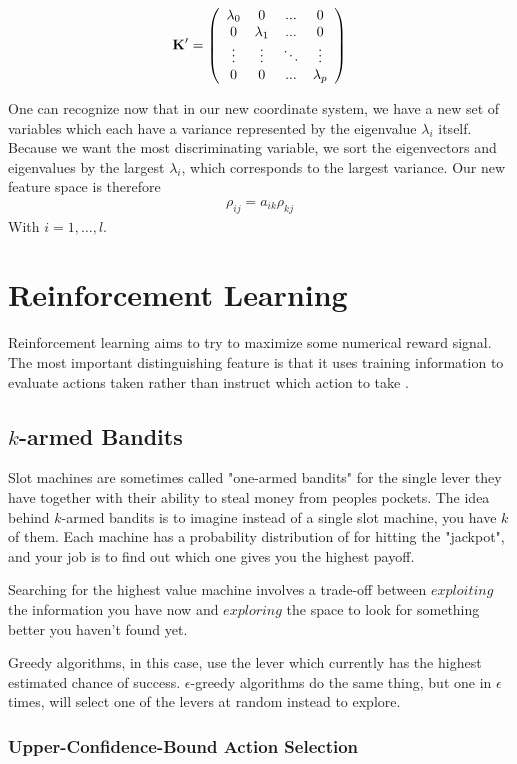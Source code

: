 $$\bf{K}' = \left(
{\begin{array}{cccc}
\lambda_0 & 0 &...&0 \\
0 & \lambda_1 & ...&0\\
\vdots & \vdots &\ddots & \vdots \\
0 & 0 & ... &\lambda_p
\end{array}}
\right)
$$

One can recognize now that in our new coordinate system, we have a new set of variables which each have a variance represented by the eigenvalue $\lambda_i$ itself. Because we want the most discriminating variable, we sort the eigenvectors and eigenvalues by the largest $\lambda_i$, which corresponds to the largest variance. Our new feature space is therefore
\begin{align}
	\rho_{ij} = a_{ik}\rho_{kj}
\end{align}
With $i=1,\dots,l$.


\section{Reinforcement Learning}
Reinforcement learning aims to try to maximize some numerical reward signal. The most important distinguishing feature is that it uses training information to evaluate actions taken rather than instruct which action to take \cite{sutton}.


\subsection{$k$-armed Bandits}
Slot machines are sometimes called "one-armed bandits" for the single lever they have together with their ability to steal money from peoples pockets. The idea behind $k$-armed bandits is to imagine instead of a single slot machine, you have $k$ of them. Each machine has a probability distribution of for hitting the "jackpot", and your job is to find out which one gives you the highest payoff.

Searching for the highest value machine involves a trade-off between $exploiting$ the information you have now and $exploring$ the space to look for something better you haven't found yet.

Greedy algorithms, in this case, use the lever which currently has the highest estimated chance of success. $\epsilon$-greedy algorithms do the same thing, but one in $\epsilon$ times, will select one of the levers at random instead to explore.


\subsubsection{Upper-Confidence-Bound Action Selection}

